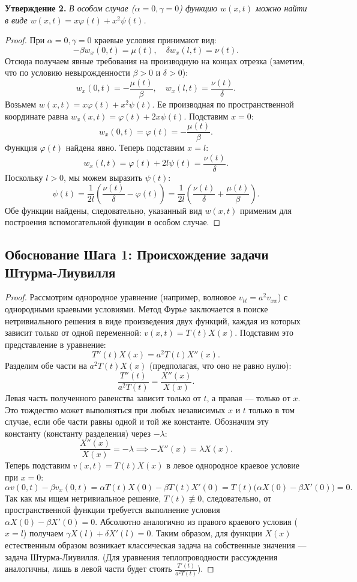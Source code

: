 \documentclass[a4paper,10pt]{article}
\begin{document}
\textbf{Утверждение 2.} \textit{В особом случае ($\alpha = 0, \gamma = 0$) функцию $w(x,t)$ можно найти в виде $w(x,t) = x \varphi(t) + x^2 \psi(t)$.}

\begin{proof}
При $\alpha = 0, \gamma = 0$ краевые условия принимают вид:
\[
- \beta w_x(0,t) = \mu(t), \quad \delta w_x(l,t) = \nu(t).
\]
Отсюда получаем явные требования на производную на концах отрезка (заметим, что по условию невырожденности $\beta > 0$ и $\delta > 0$):
\[
w_x(0,t) = -\frac{\mu(t)}{\beta}, \quad w_x(l,t) = \frac{\nu(t)}{\delta}.
\]
Возьмем $w(x,t) = x \varphi(t) + x^2 \psi(t)$. Ее производная по пространственной координате равна $w_x(x,t) = \varphi(t) + 2x \psi(t)$.
Подставим $x=0$:
\[
w_x(0,t) = \varphi(t) = -\frac{\mu(t)}{\beta}.
\]
Функция $\varphi(t)$ найдена явно. Теперь подставим $x=l$:
\[
w_x(l,t) = \varphi(t) + 2l \psi(t) = \frac{\nu(t)}{\delta}.
\]
Поскольку $l > 0$, мы можем выразить $\psi(t)$:
\[
\psi(t) = \frac{1}{2l} \left( \frac{\nu(t)}{\delta} - \varphi(t) \right) = \frac{1}{2l} \left( \frac{\nu(t)}{\delta} + \frac{\mu(t)}{\beta} \right).
\]
Обе функции найдены, следовательно, указанный вид $w(x,t)$ применим для построения вспомогательной функции в особом случае.
\end{proof}

\subsection*{Обоснование Шага 1: Происхождение задачи Штурма-Лиувилля}

\begin{proof}
Рассмотрим однородное уравнение (например, волновое $v_{tt} = a^2 v_{xx}$) с однородными краевыми условиями. Метод Фурье заключается в поиске нетривиального решения в виде произведения двух функций, каждая из которых зависит только от одной переменной: $v(x,t) = T(t)X(x)$.
Подставим это представление в уравнение:
\[ T''(t)X(x) = a^2 T(t)X''(x). \]
Разделим обе части на $a^2 T(t)X(x)$ (предполагая, что оно не равно нулю):
\[ \frac{T''(t)}{a^2 T(t)} = \frac{X''(x)}{X(x)}. \]
Левая часть полученного равенства зависит только от $t$, а правая — только от $x$. Это тождество может выполняться при любых независимых $x$ и $t$ только в том случае, если обе части равны одной и той же константе. Обозначим эту константу (константу разделения) через $-\lambda$:
\[ \frac{X''(x)}{X(x)} = -\lambda \implies -X''(x) = \lambda X(x). \]
Теперь подставим $v(x,t) = T(t)X(x)$ в левое однородное краевое условие при $x=0$:
\[ \alpha v(0,t) - \beta v_x(0,t) = \alpha T(t)X(0) - \beta T(t)X'(0) = T(t) \big(\alpha X(0) - \beta X'(0)\big) = 0. \]
Так как мы ищем нетривиальное решение, $T(t) \not\equiv 0$, следовательно, от пространственной функции требуется выполнение условия $\alpha X(0) - \beta X'(0) = 0$.
Абсолютно аналогично из правого краевого условия ($x=l$) получаем $\gamma X(l) + \delta X'(l) = 0$.
Таким образом, для функции $X(x)$ естественным образом возникает классическая задача на собственные значения — задача Штурма-Лиувилля. (Для уравнения теплопроводности рассуждения аналогичны, лишь в левой части будет стоять $\frac{T'(t)}{a^2 T(t)}$).
\end{proof}
\end{document}
